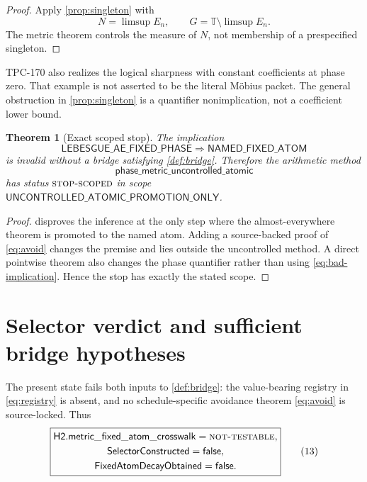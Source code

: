 \documentclass[11pt]{article}
\newtheorem{theorem}{Theorem}[section]
\theoremstyle{definition}
\theoremstyle{remark}
\newcommand{\T}{\mathbb T}
\newcommand{\NT}{\textnormal{\textsc{not-testable}}}
\newcommand{\STOPR}{\textnormal{\textsc{stop-scoped}}}
\begin{document}
\begin{proof}
Apply \cref{prop:singleton} with
\[
 N=\limsup E_n,\qquad G=\T\setminus\limsup E_n.
\]
The metric theorem controls the measure of \(N\), not membership of a
prespecified singleton.
\end{proof}

TPC-170 also realizes the logical sharpness with constant
coefficients at phase zero.  That example is not asserted to be the
literal M\"obius packet.  The general obstruction in
\cref{prop:singleton} is a quantifier nonimplication, not a
coefficient lower bound.

\begin{theorem}[Exact scoped stop]
\label{thm:stop}
The implication
\[
\mathsf{LEBESGUE\_AE\_FIXED\_PHASE}
\Longrightarrow
\mathsf{NAMED\_FIXED\_ATOM}
\tag{11}\label{eq:bad-implication}
\]
is invalid without a bridge satisfying \cref{def:bridge}.  Therefore
the arithmetic method
\[
 \mathsf{phase\_metric\_uncontrolled\_atomic}
\tag{12}\label{eq:method}
\]
has status \(\STOPR\) in scope
\(\mathsf{UNCONTROLLED\_ATOMIC\_PROMOTION\_ONLY}\).
\end{theorem}

\begin{proof}
 disproves the inference at the only step where the
almost-everywhere theorem is promoted to the named atom.  Adding a
source-backed proof of \eqref{eq:avoid} changes the premise and lies
outside the uncontrolled method.  A direct pointwise theorem also
changes the phase quantifier rather than using
\eqref{eq:bad-implication}.  Hence the stop has exactly the stated
scope.
\end{proof}

\section{Selector verdict and sufficient bridge hypotheses}

The present state fails both inputs to \cref{def:bridge}: the
value-bearing registry in \eqref{eq:registry} is absent, and no
schedule-specific avoidance theorem \eqref{eq:avoid} is source-locked.
Thus
\[
\boxed{
\begin{gathered}
\mathsf{H2.metric\_fixed\_atom\_crosswalk}=\NT,\\
\mathsf{SelectorConstructed}=\mathsf{false},\\
\mathsf{FixedAtomDecayObtained}=\mathsf{false}.
\end{gathered}}
\tag{13}\label{eq:verdict}
\]
\end{document}
